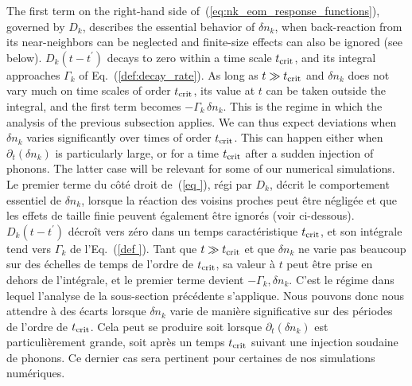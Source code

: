 \documentclass[aps,prd,notitlepage,amsfonts,amssymb,amsmath,nofootinbib,superscriptaddress,longbibliography]{revtex4-2}
\newcommand{\trad}[1]{\textcolor{tradcolor}{#1}}
\begin{document}
The first term on the right-hand side  of~(\ref{eq:nk_eom_response_functions}), governed by $D_k$, describes the essential behavior of $\delta n_{k}$, when back-reaction from its near-neighbors can be neglected and finite-size effects can also be ignored (see below).
$D_{k}\left(t-t^{\prime}\right)$ decays to zero within a time scale $t_{\rm crit}$, and its integral approaches $\Gamma_{k}$ of Eq.~(\ref{def:decay_rate}).  As long as $t \gg t_{\rm crit}$ and $\delta n_{k}$ does not vary much on time scales of order $t_{\rm crit}$, its value at $t$ can be taken outside the integral, and the first term becomes $-\Gamma_{k} \, \delta n_{k}$.  This is the regime in which the analysis of the previous subsection applies.  We can thus expect deviations when $\delta n_{k}$ varies significantly over times of order $t_{\rm crit}$.  This can happen either when $\partial_{t}\left(\delta n_{k}\right)$ is particularly large, or for a time $t_{\rm crit}$ after a sudden injection of phonons.  The latter case will be relevant for some of our numerical simulations.
\trad{
Le premier terme du côté droit de~(\ref{eq
}), régi par $D_k$, décrit le comportement essentiel de $\delta n_{k}$, lorsque la réaction des voisins proches peut être négligée et que les effets de taille finie peuvent également être ignorés (voir ci-dessous). $D_{k}\left(t-t^{\prime}\right)$ décroît vers zéro dans un temps caractéristique $t_{\rm crit}$, et son intégrale tend vers $\Gamma_{k}$ de l'Eq.~(\ref{def
}). Tant que $t \gg t_{\rm crit}$ et que $\delta n_{k}$ ne varie pas beaucoup sur des échelles de temps de l'ordre de $t_{\rm crit}$, sa valeur à $t$ peut être prise en dehors de l'intégrale, et le premier terme devient $-\Gamma_{k} , \delta n_{k}$. C'est le régime dans lequel l'analyse de la sous-section précédente s'applique. Nous pouvons donc nous attendre à des écarts lorsque $\delta n_{k}$ varie de manière significative sur des périodes de l'ordre de $t_{\rm crit}$. Cela peut se produire soit lorsque $\partial_{t}\left(\delta n_{k}\right)$ est particulièrement grande, soit après un temps $t_{\rm crit}$ suivant une injection soudaine de phonons. Ce dernier cas sera pertinent pour certaines de nos simulations numériques.
}
\end{document}

